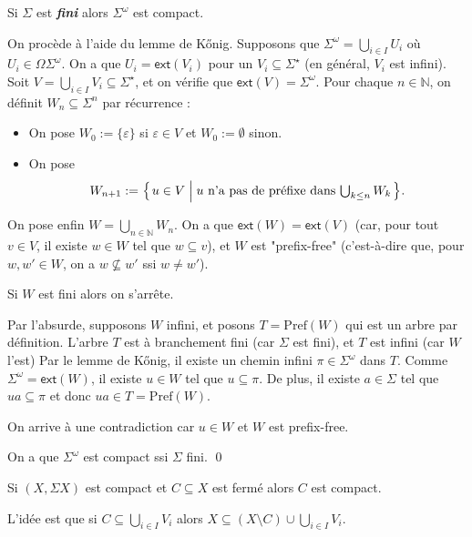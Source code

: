 \documentclass[./main]{subfiles}
\begin{document}
  \begin{prop}
    Si $\Sigma$ est \textit{\textbf{fini}} alors $\Sigma^\omega$ est compact.
  \end{prop}
  \begin{prv}
    On procède à l'aide du lemme de Kőnig.
    Supposons que $\Sigma^\omega = \bigcup_{i \in  I} U_i$ où $U_i \in \Omega\Sigma^\omega$.
    On a que $U_i = \mathsf{ext}(V_i)$ pour un $V_i \subseteq \Sigma^\star$ (en général, $V_i$ est infini).
    Soit $V = \bigcup_{i \in I} V_i \subseteq \Sigma^\star$, et on vérifie que $\mathsf{ext}(V) = \Sigma^\omega$.
    Pour chaque $n \in \mathds{N}$, on définit $W_n \subseteq \Sigma^n$ par récurrence :
    \begin{itemize}
      \item On pose $W_0 := \{\varepsilon\}$ si  $\varepsilon \in V$ et $W_0 := \emptyset$ sinon.
      \item On pose
        \[
          W_{n+1} := \mleft\{\, u \in V \;\middle|\; u \text{ n'a pas de préfixe dans } {\textstyle \bigcup_{k \le n} W_k} \,\mright\} 
        .\]
    \end{itemize}
    On pose enfin $W = \bigcup_{n \in \mathds{N}} W_n$.
    On a que $\mathsf{ext}(W) = \mathsf{ext}(V)$ (car, pour tout $v \in V$, il existe $w \in W$ tel que $w \subseteq v$), et $W$ est "prefix-free" (c'est-à-dire que, pour $w, w' \in W$, on a $w \not\subseteq w'$ ssi $w \neq w'$).

    Si $W$ est fini alors on s'arrête.

    Par l'absurde, supposons $W$ infini, et posons $T = \mathrm{Pref}(W)$ qui est un arbre par définition.
    L'arbre $T$ est à branchement fini (car $\Sigma$ est fini), et $T$ est infini (car $W$ l'est)
    Par le lemme de Kőnig, il existe un chemin infini $\pi \in \Sigma^\omega$ dans $T$.
    Comme $\Sigma^\omega = \mathsf{ext}(W)$, il existe $u \in W$ tel que $u \subseteq \pi$.
    De plus, il existe $a \in \Sigma$ tel que $ua \subseteq \pi$ et donc $ua \in T = \mathrm{Pref}(W)$.

    On arrive à une contradiction car $u \in W$ et $W$ est prefix-free.
  \end{prv}

  \begin{crlr}
    On a que $\Sigma^\omega$ est compact ssi $\Sigma$ fini.
    \qed
  \end{crlr}

  \begin{lem}
    Si $(X, \Sigma X)$ est compact et $C \subseteq X$ est fermé alors $C$ est compact.
  \end{lem}
  \begin{prv}
    L'idée est que si $C \subseteq \bigcup_{i \in I} V_i$ alors $X \subseteq (X \setminus C) \cup \bigcup_{i \in I} V_i$.
  \end{prv}
\end{document}
